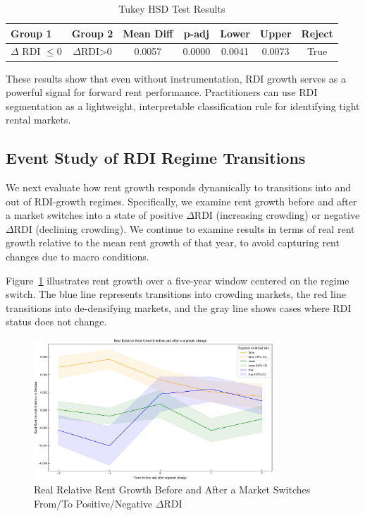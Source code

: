 \documentclass[APA,Times1COL]{WileyNJDv5} %
\begin{document}
\begin{table}[h]
	\centering
	\caption{Tukey HSD Test Results}
	\label{tab:tukey}
	
	\begin{tabular}{lcccccc} \toprule
		Group 1 & Group 2 & Mean Diff & p-adj & Lower & Upper & Reject \\ \midrule
		$\Delta$ RDI $\leq$0 & $\Delta$RDI>0 & 0.0057 & 0.0000 & 0.0041 & 0.0073 & True \\
		\bottomrule
	\end{tabular}
\end{table}

These results show that even without instrumentation, RDI growth serves as a powerful signal for forward rent performance. Practitioners can use RDI segmentation as a lightweight, interpretable classification rule for identifying tight rental markets.

\subsection{Event Study of RDI Regime Transitions}
We next evaluate how rent growth responds dynamically to transitions into and out of RDI-growth regimes. Specifically, we examine rent growth before and after a market switches into a state of positive  $\Delta$RDI (increasing crowding) or  negative  $\Delta$RDI (declining crowding). We continue to examine results in terms of real rent growth relative to the mean rent growth of that year, to avoid capturing rent changes due to macro conditions.

Figure~\ref{fig:event-study} illustrates rent growth over a five-year window centered on the regime switch. The blue line represents transitions into crowding markets, the red line transitions into de-densifying markets, and the gray line shows cases where RDI status does not change.

\begin{figure}[h]
	\centering
	\includegraphics[width=0.8\textwidth]{event_study.pdf}
	\caption{Real Relative Rent Growth Before and After a Market Switches From/To Positive/Negative $\Delta$RDI}
	\label{fig:event-study}
\end{figure}
\end{document}
